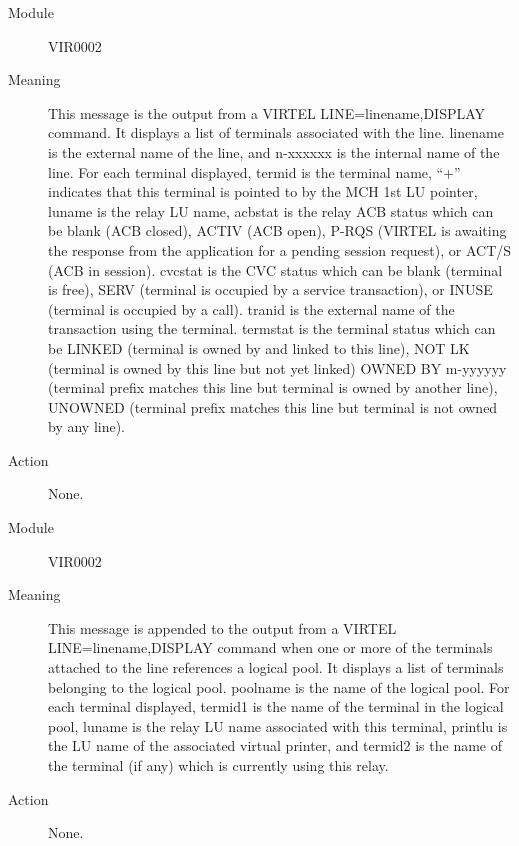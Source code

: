 \documentclass[letterpaper,10pt,english]{sphinxmanual}
\begin{document}
\begin{description}
\item[{Module}] \leavevmode
VIR0002

\item[{Meaning}] \leavevmode
This message is the output from a VIRTEL LINE=linename,DISPLAY command. It displays a list of terminals associated with the line. linename is the external name of the line, and n-xxxxxx is the internal name of the line. For each terminal displayed, termid is the terminal name, “+” indicates that this terminal is pointed to by the MCH 1st LU pointer, luname is the relay LU name, acbstat is the relay ACB status which can be blank (ACB closed), ACTIV (ACB open), P-RQS (VIRTEL is awaiting the response from the application for a pending session request), or ACT/S (ACB    in session). cvcstat is the CVC status which can be blank (terminal is free), SERV (terminal is occupied by a service transaction), or INUSE (terminal is occupied by a call). tranid is the external name of the transaction using the terminal. termstat is the terminal status which can be LINKED (terminal is owned by and linked to this line), NOT LK (terminal is owned by this line but not yet linked) OWNED BY m-yyyyyy (terminal prefix matches this line but terminal is owned by another line), UNOWNED (terminal prefix matches this line but terminal is not owned by any line).

\item[{Action}] \leavevmode
None.

\end{description}
\begin{description}
\item[{Module}] \leavevmode
VIR0002

\item[{Meaning}] \leavevmode
This message is appended to the output from a VIRTEL LINE=linename,DISPLAY command when one or more of the terminals attached to the line references a logical pool. It displays a list of terminals belonging to the logical pool.  poolname is the name of the logical pool. For each terminal displayed, termid1 is the name of the terminal in the logical pool, luname is the relay LU name associated with this terminal, printlu is the LU name of the associated virtual printer, and termid2 is the name of the terminal (if any) which is currently using this relay.

\item[{Action}] \leavevmode
None.

\end{description}
\end{document}
